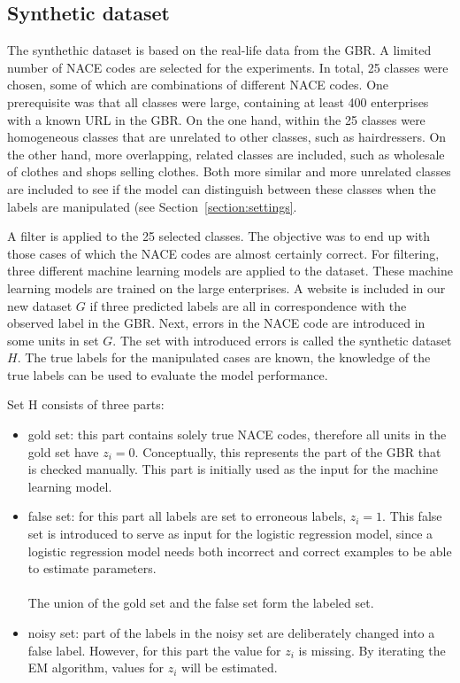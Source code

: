 \documentclass[12pt, a4paper, titlepage]{article}
\begin{document}
					\subsection{Synthetic dataset}
					\label{section:synthdata}
The synthethic dataset is based on the real-life data from the GBR. A limited number of NACE codes are selected for the experiments. In total, 25 classes were chosen, some of which are combinations of different NACE codes. One prerequisite was that all classes were large, containing at least 400 enterprises with a known URL in the GBR. On the one hand, within the 25 classes were homogeneous classes that are unrelated to other classes, such as hairdressers. On the other hand, more overlapping, related classes are included, such as wholesale of clothes and shops selling clothes. Both more similar and more unrelated classes are included to see if the model can distinguish between these classes when the labels are manipulated (see Section~\ref{section:settings}.

A filter is applied to the 25 selected classes. The objective was to end up with those cases of which the NACE codes are almost certainly correct. For filtering, three different machine learning models are applied to the dataset. These machine learning models are trained on the large enterprises. A website is included in our new dataset $G$ if three predicted labels are all in correspondence with the observed label in the GBR. Next, errors in the NACE code are introduced in some units in set $G$. The set with introduced errors is called the synthetic dataset $H$. The true labels for the manipulated cases are known, the knowledge of the true labels can be used to evaluate the model performance.

Set H consists of three parts:
\begin{itemize}
\item gold set: this part contains solely true NACE codes, therefore all units in the gold set have $z_i = 0$. Conceptually, this represents the part of the GBR that is checked manually. This part is initially used as the input for the machine learning model.
\item false set: for this part all labels are set to erroneous labels, $z_i = 1$. This false set is introduced to serve as input for the logistic regression model, since a logistic regression model needs both incorrect and correct examples to be able to estimate parameters.\\
\\
The union of the gold set and the false set form the labeled set.
\item noisy set: part of the labels in the noisy set are deliberately changed into a false label. However, for this part the value for $z_i$ is missing. By iterating the EM algorithm, values for $z_i$ will be estimated.
\end{itemize}
\end{document}
